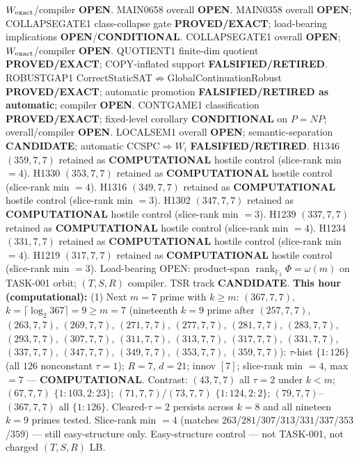 \documentclass[11pt]{article}
\begin{document}
$W_{\rm exact}$/compiler \textbf{OPEN}.
MAIN0658 overall \textbf{OPEN}.
MAIN0358 overall \textbf{OPEN}; COLLAPSEGATE1 class-collapse gate \textbf{PROVED/EXACT};
load-bearing implications \textbf{OPEN}/\textbf{CONDITIONAL}.
COLLAPSEGATE1 overall \textbf{OPEN}; $W_{\rm exact}$/compiler \textbf{OPEN}.
QUOTIENT1 finite-dim quotient \textbf{PROVED/EXACT}; COPY-inflated support \textbf{FALSIFIED/RETIRED}.
ROBUSTGAP1 CorrectStaticSAT$\not\Rightarrow$GlobalContinuationRobust \textbf{PROVED/EXACT};
automatic promotion \textbf{FALSIFIED/RETIRED as automatic}; compiler \textbf{OPEN}.
CONTGAME1 classification \textbf{PROVED/EXACT}; fixed-level corollary \textbf{CONDITIONAL} on $P=NP$;
overall/compiler \textbf{OPEN}.
LOCALSEM1 overall \textbf{OPEN}; semantic-separation \textbf{CANDIDATE}; automatic CCSPC$\Rightarrow W_i$
\textbf{FALSIFIED/RETIRED}.
H1346 $(359,7,7)$ retained as \textbf{COMPUTATIONAL} hostile control (slice-rank min $=4$).
H1330 $(353,7,7)$ retained as \textbf{COMPUTATIONAL} hostile control (slice-rank min $=4$).
H1316 $(349,7,7)$ retained as \textbf{COMPUTATIONAL} hostile control (slice-rank min $=3$).
H1302 $(347,7,7)$ retained as \textbf{COMPUTATIONAL} hostile control (slice-rank min $=3$).
H1239 $(337,7,7)$ retained as \textbf{COMPUTATIONAL} hostile control (slice-rank min $=4$).
H1234 $(331,7,7)$ retained as \textbf{COMPUTATIONAL} hostile control (slice-rank min $=4$).
H1219 $(317,7,7)$ retained as \textbf{COMPUTATIONAL} hostile control (slice-rank min $=3$).
Load-bearing OPEN: product-span $\operatorname{rank}_{\mathbb F_2}\Phi=\omega(m)$ on TASK-001 orbit;
$(T,S,R)$ compiler. TSR track \textbf{CANDIDATE}.
\textbf{This hour (computational):}
(1) Next $m{=}7$ prime with $k{\ge}m$: $(367,7,7)$, $k{=}\lceil\log_2 367\rceil=9{\ge}m{=}7$
(nineteenth $k{=}9$ prime after $(257,7,7)$, $(263,7,7)$, $(269,7,7)$, $(271,7,7)$, $(277,7,7)$, $(281,7,7)$, $(283,7,7)$, $(293,7,7)$, $(307,7,7)$, $(311,7,7)$, $(313,7,7)$, $(317,7,7)$, $(331,7,7)$, $(337,7,7)$, $(347,7,7)$, $(349,7,7)$, $(353,7,7)$, $(359,7,7)$):
$\tau$-hist $\{1{:}126\}$ (all $126$ nonconstant $\tau{=}1$); $R{=}7$, $d{=}21$; innov $[7]$;
slice-rank min $=4$, max $=7$ --- \textbf{COMPUTATIONAL}.
Contrast: $(43,7,7)$ all $\tau{=}2$ under $k{<}m$; $(67,7,7)$ $\{1{:}103,2{:}23\}$;
$(71,7,7)$/$(73,7,7)$ $\{1{:}124,2{:}2\}$; $(79,7,7)$--$(367,7,7)$ all $\{1{:}126\}$.
Cleared-$\tau{=}2$ persists across $k{=}8$ and all nineteen $k{=}9$ primes tested.
Slice-rank min $=4$ (matches $263$/$281$/$307$/$313$/$331$/$337$/$353$/$359$) --- still easy-structure only.
Easy-structure control --- not TASK-001, not charged $(T,S,R)$ LB.
\end{document}
